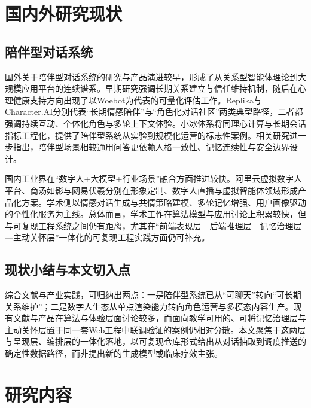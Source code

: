 \documentclass{base}
\begin{document}
\section{国内外研究现状}

\subsection{陪伴型对话系统}

国外关于陪伴型对话系统的研究与产品演进较早，形成了从关系型智能体理论到大规模应用平台的连续谱系。早期研究强调长期关系建立与信任维持机制\cite{Bickmore2005}，随后在心理健康支持方向出现了以Woebot为代表的可量化评估工作\cite{Fitzpatrick2017}。Replika与Character.AI分别代表``长期情感陪伴''与``角色化对话社区''两类典型路径，二者都强调持续互动、个体化角色与多轮上下文体验\cite{ReplikaOfficial,CharacterAIAbout}。小冰体系将同理心计算与长期会话指标工程化，提供了陪伴型系统从实验到规模化运营的标志性案例\cite{ShumXiaoice2020}。相关研究进一步指出，陪伴型场景相较通用问答更依赖人格一致性、记忆连续性与安全边界设计\cite{Roller2021,Zhao2023Survey}。

国内工业界在``数字人+大模型+行业场景''融合方面推进较快。阿里云虚拟数字人平台、商汤如影与网易伏羲分别在形象定制、数字人直播与虚拟智能体领域形成产品化方案\cite{AliyunAvatarProduct,SenseAvatarProduct,NeteaseFuxiAgent}。学术侧以情感对话生成与共情策略建模\cite{Li2021EmotionDialogueCN,Chen2022EmpatheticDialogueCN}、多轮记忆增强\cite{Sun2022DialogueMemoryCN}、用户画像驱动的个性化服务\cite{He2023UserProfileCN}为主线。总体而言，学术工作在算法模型与应用讨论上积累较快，但与可复现工程系统之间仍有距离，尤其在``前端表现层—后端推理层—记忆治理层—主动关怀层''一体化的可复现工程实践方面仍可补充。

\subsection{现状小结与本文切入点}

综合文献与产业实践，可归纳出两点：一是陪伴型系统已从``可聊天''转向``可长期关系维护''；二是数字人生态从单点渲染能力转向角色运营与多模态内容生产。现有文献与产品在算法与体验层面讨论较多，而面向教学可用的、可将记忆治理层与主动关怀层置于同一套Web工程中联调验证的案例仍相对分散。本文聚焦于这两层与呈现层、编排层的一体化落地，以可复现仓库形式给出从对话抽取到调度推送的确定性数据路径，而非提出新的生成模型或临床疗效主张。

\section{研究内容}
\end{document}
